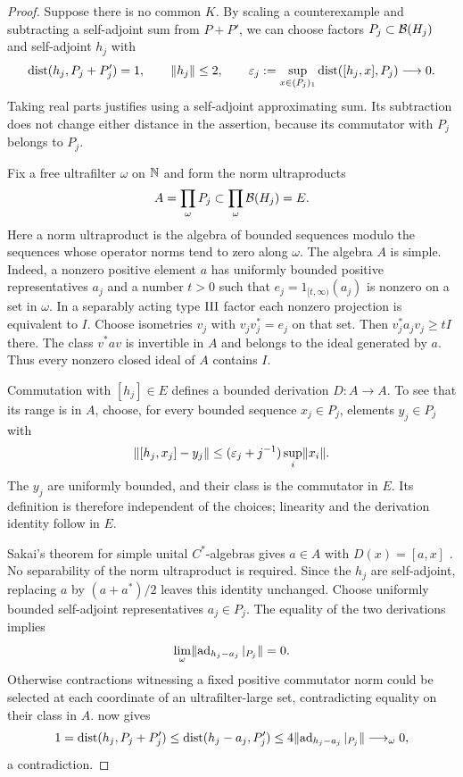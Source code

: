 \begin{proof}
Suppose there is no common $K$. By scaling a counterexample and
subtracting a self-adjoint sum from $P+P'$, we can choose factors
$P_j\subset\mathcal B(H_j)$ and self-adjoint $h_j$ with
\[
 \operatorname{dist}(h_j,P_j+P_j')=1,
 \qquad \lVert h_j\rVert\le2,
 \qquad
 \varepsilon_j:=\sup_{x\in(P_j)_1}\operatorname{dist}([h_j,x],P_j)\longrightarrow0.
\]
Taking real parts justifies using a self-adjoint approximating sum.
Its subtraction does not change either distance in the assertion,
because its commutator with $P_j$ belongs to $P_j$.

Fix a free ultrafilter $\omega$ on $\mathbb N$ and form the norm
ultraproducts
\[
 A=\prod_\omega P_j\subset \prod_\omega\mathcal B(H_j)=E.
\]
Here a norm ultraproduct is the algebra of bounded sequences modulo
the sequences whose operator norms tend to zero along $\omega$.
The algebra $A$ is simple. Indeed, a nonzero positive element $a$
has uniformly bounded positive representatives $a_j$ and a number
$t>0$ such that $e_j=1_{[t,\infty)}(a_j)$ is nonzero on a set in
$\omega$. In a separably acting type $\mathrm{III}$ factor each nonzero
projection is equivalent to $I$. Choose isometries $v_j$ with
$v_jv_j^*=e_j$ on that set. Then
$v_j^*a_jv_j\ge tI$ there. The class $v^*av$ is invertible in $A$
and belongs to the ideal generated by $a$. Thus every nonzero
closed ideal of $A$ contains $I$.

Commutation with $[h_j]\in E$ defines a bounded derivation
$D:A\to A$. To see that its range is in $A$, choose, for every
bounded sequence $x_j\in P_j$, elements $y_j\in P_j$ with
\[
 \lVert[h_j,x_j]-y_j\rVert
 \le (\varepsilon_j+j^{-1})\sup_i\lVert x_i\rVert.
\]
The $y_j$ are uniformly bounded, and their class is the commutator
in $E$. Its definition is therefore independent of the choices;
linearity and the derivation identity follow in $E$.

Sakai's theorem for simple unital $C^*$-algebras gives $a\in A$
with $D(x)=[a,x]$ \cite[Section~1, p.~259; Section~2, p.~260]{Sakai1971}.
No separability of the norm ultraproduct is required. Since the
$h_j$ are self-adjoint, replacing $a$ by $(a+a^*)/2$ leaves this
identity unchanged. Choose uniformly bounded self-adjoint
representatives $a_j\in P_j$. The equality of the two derivations
implies
\[
 \lim_\omega\lVert\operatorname{ad}_{h_j-a_j}|_{P_j}\rVert=0.
\]
Otherwise contractions witnessing a fixed positive commutator norm
could be selected at each coordinate of an ultrafilter-large set,
contradicting equality on their class in $A$.
 now gives
\[
 1=\operatorname{dist}(h_j,P_j+P_j')
 \le\operatorname{dist}(h_j-a_j,P_j')
 \le4\lVert\operatorname{ad}_{h_j-a_j}|_{P_j}\rVert\longrightarrow_\omega0,
\]
a contradiction.
\end{proof}

